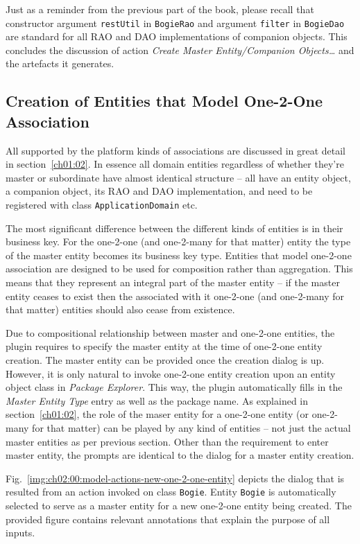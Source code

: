   Just as a reminder from the previous part of the book, please recall that constructor argument \texttt{restUtil} in \texttt{BogieRao} and argument \texttt{filter} in \texttt{BogieDao} are standard for all RAO and DAO implementations of companion objects.
  This concludes the discussion of action \emph{Create Master Entity/Companion Objects\ldots} and the artefacts it generates.
 

  \subsection{Creation of Entities that Model One-2-One Association}  
 
  All supported by the platform kinds of associations are discussed in great detail in section~\ref{ch01:02}.
  In essence all domain entities regardless of whether they're master or subordinate have almost identical structure -- all have an entity object, a companion object, its RAO and DAO implementation, and need to be registered with class \texttt{ApplicationDomain} etc.
  
  The most significant difference between the different kinds of entities is in their business key.
  For the one-2-one (and one-2-many for that matter) entity the type of the master entity becomes its business key type.
  Entities that model one-2-one association are designed to be used for composition rather than aggregation.
  This means that they represent an integral part of the master entity -- if the master entity ceases to exist then the associated with it one-2-one (and one-2-many for that matter) entities should also cease from existence.
  
  Due to compositional relationship between master and one-2-one entities, the plugin requires to specify the master entity at the time of one-2-one entity creation.
  The master entity can be provided once the creation dialog is up.
  However, it is only natural to invoke one-2-one entity creation upon an entity object class in \emph{Package Explorer}.
  This way, the plugin automatically fills in the \emph{Master Entity Type} entry as well as the package name.
  As explained in section~\ref{ch01:02}, the role of the maser entity for a one-2-one entity (or one-2-many for that matter) can be played by any kind of entities -- not just the actual master entities as per previous section.
  Other than the requirement to enter master entity, the prompts are identical to the dialog for a master entity creation.
  
  Fig.~\ref{img:ch02:00:model-actions-new-one-2-one-entity} depicts the dialog that is resulted from an action invoked on class \texttt{Bogie}.
  Entity \texttt{Bogie} is automatically selected to serve as a master entity for a new one-2-one entity being created.
  The provided figure contains relevant annotations that explain the purpose of all inputs.
 
